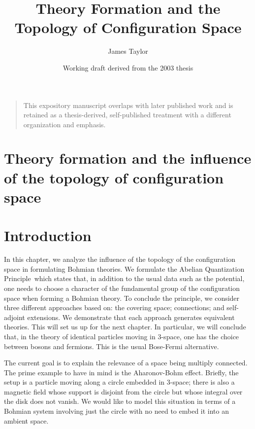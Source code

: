 \documentclass[11pt]{article}
\title{Theory Formation and the Topology of Configuration Space}
\author{James Taylor}
\date{Working draft derived from the 2003 thesis}
\theoremstyle{remark}
\begin{document}
\maketitle

\begin{quote}\small This expository manuscript overlaps with later published work and is retained as a thesis-derived, self-published treatment with a different organization and emphasis.\end{quote}

\section{Theory formation and the influence of 
the topology of configuration space} \label{c:top}


\section{Introduction} \label{s:introi}

In this chapter, we analyze the influence of the topology of the
configuration space in formulating Bohmian theories. 
We formulate the Abelian Quantization Principle\ which states that, in addition to the
usual data such as the potential, one needs to choose
a character of the fundamental group of the configuration space 
 when forming a Bohmian theory.  
To conclude the principle, we consider three different approaches
based on: the covering space; connections; and self-adjoint extensions.
We demonstrate that each approach generates equivalent theories. 
This will set us up for the next chapter. In particular, we will 
conclude that, in the theory of
identical particles moving in 3-space, 
one has the choice between bosons and fermions. This is the usual
Bose-Fermi alternative.


The current goal  is to explain the relevance of
a space being multiply connected. The prime example to have in mind is
the Aharonov-Bohm effect. Briefly, the setup is 
a particle moving along a circle embedded in 3-space; there is also 
a magnetic field  whose support is disjoint from the circle but whose integral
over the disk does not vanish. We would like to
model this situation in terms of a Bohmian system involving just the
circle with no need to embed it into an ambient space. 
\end{document}
